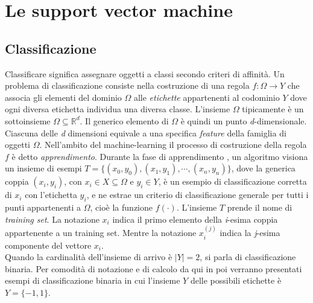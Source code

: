 \documentclass [11pt,a4paper,twoside,openright] {book}
\begin{document}
\chapter{Le support vector machine}
\section{Classificazione}
Classificare significa assegnare oggetti a classi secondo criteri di affinità. Un problema di classificazione consiste nella costruzione di una regola $f: \Omega \rightarrow Y$ che associa gli elementi del dominio $\Omega$ alle \textit{etichette} appartenenti al codominio $Y$ dove ogni diversa etichetta individua una diversa classe. L'insieme $\Omega$ tipicamente è un sottoinsieme $\Omega \subseteq \mathbb{R}^d$. Il generico elemento di $\Omega$ è quindi un punto \textit{d}-dimensionale. Ciascuna delle \textit{d} dimensioni equivale a una specifica \textit{feature} della famiglia di oggetti $\Omega$. Nell'ambito del machine-learning il processo di costruzione della regola $f$ è detto \textit{apprendimento}. Durante la fase di apprendimento , un algoritmo visiona un insieme di esempi $T=\lbrace (x_0,y_0), (x_1,y_1), \cdots, (x_n,y_n) \rbrace$, dove la generica coppia $(x_i,y_i)$, con $x_i \in X \subseteq \Omega$ e $y_i \in Y$, è un esempio di classificazione corretta di $x_i$ con l'etichetta $y_i$, e ne estrae un criterio di classificazione generale per tutti i punti appartenenti a $\Omega$, cioè la funzione $f(\cdot)$. L'insieme $T$ prende il nome di \textit{training set}. La notazione $x_i$ indica il primo elemento della \textit{i}-esima coppia appartenente a un training set. Mentre la notazione $x_{i}^{(j)}$ indica la \textit{j}-esima componente del vettore $x_i$.\\
Quando la cardinalità dell'insieme di arrivo è $|Y|=2$, si parla di classificazione binaria. Per comodità di notazione e di calcolo da qui in poi verranno presentati esempi di classificazione binaria in cui l'insieme $Y$ delle possibili etichette è $Y=\lbrace-1,1\rbrace$.
\end{document}
